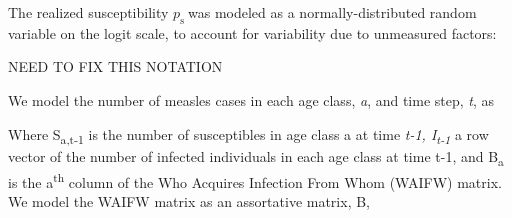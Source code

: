 The realized susceptibility \(p_{\text{s\ }}\)was modeled as a
normally-distributed random variable on the logit scale, to account for
variability due to unmeasured factors:

NEED TO FIX THIS NOTATION




We model the number of measles cases in each age class, \emph{a}, and
time step, \emph{t}, as


Where S\textsubscript{a,t-1} is the number of susceptibles in age class
a at time \emph{t-1, I\textsubscript{t-1}} a row vector of the number of
infected individuals in each age class at time t-1, and
B\textsubscript{a} is the a\textsuperscript{th} column of the Who
Acquires Infection From Whom (WAIFW) matrix. We model the WAIFW matrix
as an assortative matrix, B,